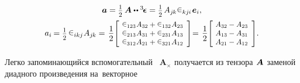 \begin{otherlanguage}{russian}
\nopagebreak\vspace{-0.5em}\begin{equation*}\begin{array}{c}
\bm{a} = \smalldisplaystyleonehalf \, \bm{A} \dotdotp \levicivitatensor =
\smalldisplaystyleonehalf \hspace{.25ex} A_{j\hspace{-0.1ex}k} \levicivita_{kj\hspace{-0.06ex}i} \hspace{.2ex} \bm{e}_i , \\[0.64em]
a_{i} \hspace{-0.16ex} = \smalldisplaystyleonehalf \hspace{.32ex} \levicivita_{ikj} \hspace{.1ex} A_{j\hspace{-0.1ex}k} = \hspace{.1em}
\displaystyle \onehalf \scalebox{0.9}[0.9]{$\left[\hspace{-0.25ex} \begin{array}{c}
\levicivita_{123} \hspace{.1ex} A_{32} + \levicivita_{132} \hspace{.1ex} A_{23} \\
\levicivita_{213} \hspace{.1ex} A_{31} + \levicivita_{231} \hspace{.1ex} A_{13} \\
\levicivita_{312} \hspace{.1ex} A_{21} + \levicivita_{321} \hspace{.1ex} A_{12}
\end{array} \right]$} \hspace{-0.2em} = \hspace{.1em}
\displaystyle \onehalf \scalebox{0.9}[0.9]{$\left[\hspace{-0.3ex} \begin{array}{c}
A_{32} - A_{23} \\
A_{13} - A_{31} \\
A_{21} - A_{12}
\end{array} \right]$} .
\vspace{.1em}\end{array}\end{equation*}

Легко запоминающийся вспомогательный ~${\!\bm{A}_{\!\bm{\times}}}$ получается из тензора~${\hspace{-0.2ex}\bm{A}}$ заменой диадного произведения на~векторное


\end{otherlanguage}

